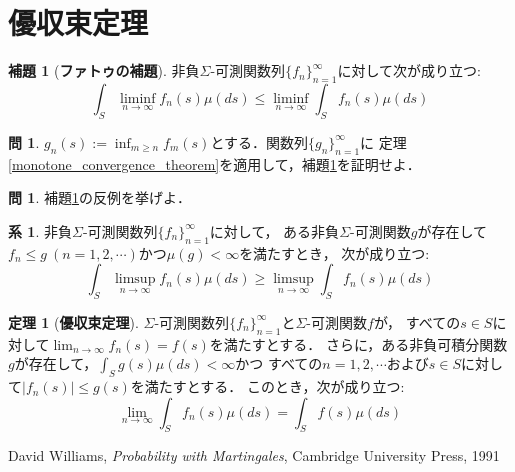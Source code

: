\documentclass{jsreport}
\theoremstyle{definition}
\newtheorem{lem}[defi]{補題}
\newtheorem{thm}[defi]{定理}
\newtheorem{cor}[defi]{系}
\newtheorem{qst}[defi]{問}
\begin{document}
\section{優収束定理}

\begin{lem}[\textbf{ファトゥの補題}]\label{Fatou_lemma}
非負$\Sigma$-可測関数列$\{f_n\}_{n=1}^\infty$に対して次が成り立つ:
\[ \int_S\liminf_{n\to\infty}f_n(s)\mu(ds)\leq\liminf_{n\to\infty}\int_S f_n(s)\mu(ds) \]
\end{lem}

\begin{qst}\label{qst_proof_of_Fatou_lemma}
$g_n(s):=\displaystyle\inf_{m \geq n}f_m(s)$とする．関数列$\{g_n\}_{n=1}^\infty$に
定理\ref{monotone_convergence_theorem}を適用して，補題\ref{Fatou_lemma}を証明せよ．
\end{qst}

\begin{qst}\label{qst_counterexample_of_Fatou_lemma}
補題\ref{Fatou_lemma}の反例を挙げよ．
\end{qst}

\begin{cor}\label{reverse_Fatou_lemma}
非負$\Sigma$-可測関数列$\{f_n\}_{n=1}^\infty$に対して，
ある非負$\Sigma$-可測関数$g$が存在して
$f_n \leq g\ (n=1,2,\cdots)$かつ$\mu(g)<\infty$を満たすとき，
次が成り立つ:
\[ \int_S\limsup_{n\to\infty}f_n(s)\mu(ds)\geq\limsup_{n\to\infty}\int_S f_n(s)\mu(ds) \]
\end{cor}

\begin{thm}[\textbf{優収束定理}]\label{dominated_convergence_theorem}
$\Sigma$-可測関数列$\{f_n\}_{n=1}^\infty$と$\Sigma$-可測関数$f$が，
すべての$s \in S$に対して$\displaystyle\lim_{n\to\infty}f_n(s)=f(s)$を満たすとする．
さらに，ある非負可積分関数$g$が存在して，$\displaystyle\int_Sg(s)\mu(ds)<\infty$かつ
すべての$n=1,2,\cdots$および$s \in S$に対して$|f_n(s)| \leq g(s)$を満たすとする．
このとき，次が成り立つ:
\[ \lim_{n\to\infty}\int_Sf_n(s)\mu(ds)=\int_Sf(s)\mu(ds) \]
\end{thm}


\begin{thebibliography}{9}
\item David Williams, \textit{Probability with Martingales}, Cambridge University Press, 1991
\end{thebibliography}
\end{document}
